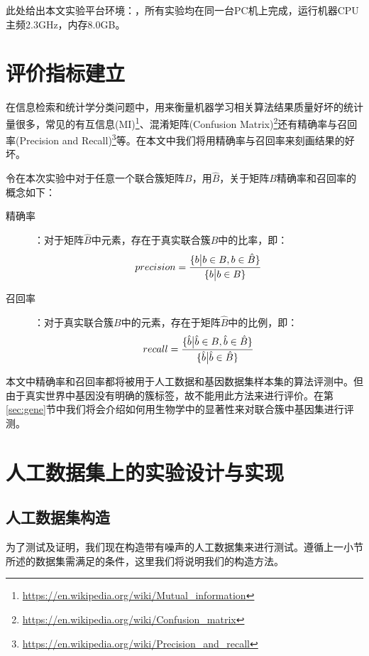 \vspace{2mm}
此处给出本文实验平台环境：，所有实验均在同一台PC机上完成，运行机器CPU主频2.3GHz，内存8.0GB。

\section{评价指标建立}
\label{subsec:evaluation}
在信息检索和统计学分类问题中，用来衡量机器学习相关算法结果质量好坏的统计量很多，常见的有互信息(MI)\footnote{\url{https://en.wikipedia.org/wiki/Mutual_information}}、混淆矩阵(Confusion Matrix)\footnote{\url{https://en.wikipedia.org/wiki/Confusion_matrix}}还有精确率与召回率(Precision and Recall)\footnote{\url{https://en.wikipedia.org/wiki/Precision_and_recall}}等。在本文中我们将用精确率与召回率来刻画结果的好坏。

令在本次实验中对于任意一个联合簇矩阵$B$，用$\hat{B}$，关于矩阵$B$精确率和召回率的概念如下：
\begin{description}
\item[精确率]：对于矩阵$\hat{B}$中元素，存在于真实联合簇$B$中的比率，即：
\begin{equation}
precision = \frac{\{b\big{|}b\in{}B,b\in{}\hat{B}\}}{\{b\big{|}b\in{}B\}}
\end{equation}
\item[召回率]：对于真实联合簇$B$中的元素，存在于矩阵$\hat{B}$中的比例，即：
\begin{equation}
recall = \frac{\{\hat{b}\big{|}\hat{b}\in{}B,\hat{b}\in{}\hat{B}\}}{\{\hat{b}\big{|}\hat{b}\in{}\hat{B}\}}
\end{equation}
\end{description}

本文中精确率和召回率都将被用于人工数据和基因数据集样本集的算法评测中。但由于真实世界中基因没有明确的簇标签，故不能用此方法来进行评价。在第\ref{sec:gene}节中我们将会介绍如何用生物学中的显著性来对联合簇中基因集进行评测。

\section{人工数据集上的实验设计与实现}
\label{sec:artificial}
\subsection{人工数据集构造}
\label{subsec:construct}
为了测试及证明，我们现在构造带有噪声的人工数据集来进行测试。遵循上一小节所述的数据集需满足的条件，这里我们将说明我们的构造方法。


